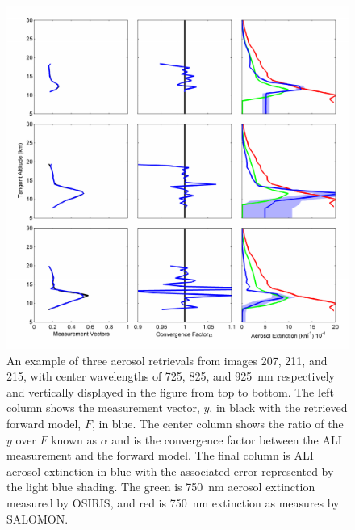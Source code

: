 \begin{figure}
\includegraphics[width=1.0\textwidth]{./Images/5-3-AliRetreivals.pdf}
    \caption[TODO:Write This]{An example of three aerosol retrievals from images 207, 211, and 215, with center wavelengths of 725, 825, and 925~nm respectively and vertically displayed in the figure from top to bottom. The left column shows the measurement vector, $y$, in black with the retrieved forward model, $F$, in blue. The center column shows the ratio of the $y$ over $F$ known as $\alpha$ and is the convergence factor between the ALI measurement and the forward model. The final column is ALI aerosol extinction in blue with the associated error represented by the light blue shading. The green is 750~nm aerosol extinction measured by OSIRIS, and red is 750~nm extinction as measures by SALOMON.}
    \label{fig:5.3:AliRetreivals}
\end{figure} 